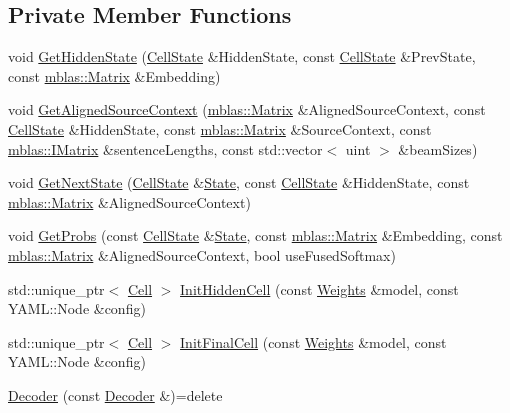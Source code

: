 \subsection*{Private Member Functions}
\begin{DoxyCompactItemize}
\item 
void \hyperlink{classamunmt_1_1GPU_1_1Decoder_a947db89d51295ae98c8f36769747faeb}{Get\+Hidden\+State} (\hyperlink{structamunmt_1_1GPU_1_1CellState}{Cell\+State} \&Hidden\+State, const \hyperlink{structamunmt_1_1GPU_1_1CellState}{Cell\+State} \&Prev\+State, const \hyperlink{namespaceamunmt_1_1GPU_1_1mblas_ab67821a8254de53e45a623cf73c0aef6}{mblas\+::\+Matrix} \&Embedding)
\item 
void \hyperlink{classamunmt_1_1GPU_1_1Decoder_ad11a95e0d1519604bf1d14a8b33970ca}{Get\+Aligned\+Source\+Context} (\hyperlink{namespaceamunmt_1_1GPU_1_1mblas_ab67821a8254de53e45a623cf73c0aef6}{mblas\+::\+Matrix} \&Aligned\+Source\+Context, const \hyperlink{structamunmt_1_1GPU_1_1CellState}{Cell\+State} \&Hidden\+State, const \hyperlink{namespaceamunmt_1_1GPU_1_1mblas_ab67821a8254de53e45a623cf73c0aef6}{mblas\+::\+Matrix} \&Source\+Context, const \hyperlink{namespaceamunmt_1_1GPU_1_1mblas_ad6a337d269d1833a6028b8871e57d2d0}{mblas\+::\+I\+Matrix} \&sentence\+Lengths, const std\+::vector$<$ uint $>$ \&beam\+Sizes)
\item 
void \hyperlink{classamunmt_1_1GPU_1_1Decoder_ab3d25eba9931b504c882cf7b3299ae78}{Get\+Next\+State} (\hyperlink{structamunmt_1_1GPU_1_1CellState}{Cell\+State} \&\hyperlink{classamunmt_1_1State}{State}, const \hyperlink{structamunmt_1_1GPU_1_1CellState}{Cell\+State} \&Hidden\+State, const \hyperlink{namespaceamunmt_1_1GPU_1_1mblas_ab67821a8254de53e45a623cf73c0aef6}{mblas\+::\+Matrix} \&Aligned\+Source\+Context)
\item 
void \hyperlink{classamunmt_1_1GPU_1_1Decoder_a159b5073f45c09063805970c1e959ed8}{Get\+Probs} (const \hyperlink{structamunmt_1_1GPU_1_1CellState}{Cell\+State} \&\hyperlink{classamunmt_1_1State}{State}, const \hyperlink{namespaceamunmt_1_1GPU_1_1mblas_ab67821a8254de53e45a623cf73c0aef6}{mblas\+::\+Matrix} \&Embedding, const \hyperlink{namespaceamunmt_1_1GPU_1_1mblas_ab67821a8254de53e45a623cf73c0aef6}{mblas\+::\+Matrix} \&Aligned\+Source\+Context, bool use\+Fused\+Softmax)
\item 
std\+::unique\+\_\+ptr$<$ \hyperlink{classamunmt_1_1GPU_1_1Cell}{Cell} $>$ \hyperlink{classamunmt_1_1GPU_1_1Decoder_ab8aad68c5ae192b1b196494541377374}{Init\+Hidden\+Cell} (const \hyperlink{structamunmt_1_1GPU_1_1Weights}{Weights} \&model, const Y\+A\+M\+L\+::\+Node \&config)
\item 
std\+::unique\+\_\+ptr$<$ \hyperlink{classamunmt_1_1GPU_1_1Cell}{Cell} $>$ \hyperlink{classamunmt_1_1GPU_1_1Decoder_afab573b85077912f4ab758c5655db8de}{Init\+Final\+Cell} (const \hyperlink{structamunmt_1_1GPU_1_1Weights}{Weights} \&model, const Y\+A\+M\+L\+::\+Node \&config)
\item 
\hyperlink{classamunmt_1_1GPU_1_1Decoder_a472b5f38702e1a9a63211c3252c3bc32}{Decoder} (const \hyperlink{classamunmt_1_1GPU_1_1Decoder}{Decoder} \&)=delete
\end{DoxyCompactItemize}
